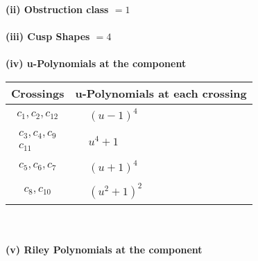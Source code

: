 \documentclass[1p]{elsarticle_modified}
\theoremstyle{definition}
\begin{document}
\flushleft \textbf{(ii) Obstruction class $= 1$}\\~\\
\flushleft \textbf{(iii) Cusp Shapes $= 4$}\\~\\
\newpage\renewcommand{\arraystretch}{1}
\flushleft \textbf{(iv) u-Polynomials at the component}\newline \\
\begin{tabular}{m{50pt}|m{274pt}}
Crossings & \hspace{64pt}u-Polynomials at each crossing \\
\hline $$\begin{aligned}c_{1},c_{2},c_{12}\end{aligned}$$&$\begin{aligned}
&(u-1)^4
\end{aligned}$\\
\hline $$\begin{aligned}c_{3},c_{4},c_{9}\\c_{11}\end{aligned}$$&$\begin{aligned}
&u^4+1
\end{aligned}$\\
\hline $$\begin{aligned}c_{5},c_{6},c_{7}\end{aligned}$$&$\begin{aligned}
&(u+1)^4
\end{aligned}$\\
\hline $$\begin{aligned}c_{8},c_{10}\end{aligned}$$&$\begin{aligned}
&(u^2+1)^2
\end{aligned}$\\
\hline
\end{tabular}\\~\\
\newpage\renewcommand{\arraystretch}{1}
\flushleft \textbf{(v) Riley Polynomials at the component}\newline \\
\end{document}
